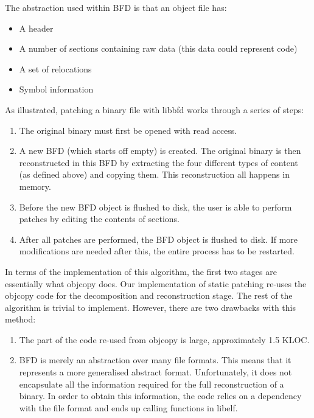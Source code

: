 The abstraction used within BFD is that an object file has:

\begin{itemize}
\item A header
\item A number of sections containing raw data (this data could represent code)
\item A set of relocations
\item Symbol information
\end{itemize}

As illustrated, patching a binary file with libbfd works through a series of steps:

\begin{enumerate}
\item The original binary must first be opened with read access.
\item A new BFD (which starts off empty) is created. The original binary is then reconstructed in this BFD by extracting the four different types of content (as defined above) and copying them. This reconstruction all happens in memory.
\item Before the new BFD object is flushed to disk, the user is able to perform patches by editing the contents of sections.
\item After all patches are performed, the BFD object is flushed to disk. If more modifications are needed after this, the entire process has to be restarted.
\end{enumerate}

In terms of the implementation of this algorithm, the first two stages are essentially what objcopy does. Our implementation of static patching re-uses the objcopy code for the decomposition and reconstruction stage. The rest of the algorithm is trivial to implement. However, there are two drawbacks with this method:

\begin{enumerate}
\item The part of the code re-used from objcopy is large, approximately 1.5 KLOC.
\item BFD is merely an abstraction over many file formats. This means that it represents a more generalised abstract format. Unfortunately, it does not encapsulate all the information required for the full reconstruction of a binary. In order to obtain this information, the code relies on a dependency with the file format and ends up calling functions in libelf.
\end{enumerate}

